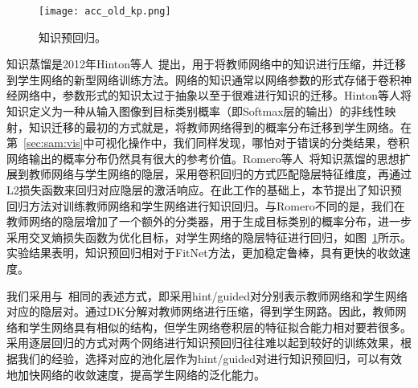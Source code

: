 \begin{figure}[t]
\centering
\centerline{\texttt{[image: acc\_old\_kp.png]}}
\caption{知识预回归。}
\label{fig:acc_kp}
\end{figure} 

知识蒸馏是2012年Hinton等人~\cite{hinton2015distilling}提出，用于将教师网络中的知识进行压缩，并迁移到学生网络的新型网络训练方法。网络的知识通常以网络参数的形式存储于卷积神经网络中，参数形式的知识太过于抽象以至于很难进行知识的迁移。Hinton等人将知识定义为一种从输入图像到目标类别概率（即Softmax层的输出）的非线性映射，知识迁移的最初的方式就是，将教师网络得到的概率分布迁移到学生网络。在第~\ref{sec:sam:vis}中可视化操作中，我们同样发现，哪怕对于错误的分类结果，卷积网络输出的概率分布仍然具有很大的参考价值。Romero等人~\cite{romero2014fitnets}将知识蒸馏的思想扩展到教师网络与学生网络的隐层，采用卷积回归的方式匹配隐层特征维度，再通过L2损失函数来回归对应隐层的激活响应。在此工作的基础上，本节提出了知识预回归方法对训练教师网络和学生网络进行知识回归。与Romero不同的是，我们在教师网络的隐层增加了一个额外的分类器，用于生成目标类别的概率分布，进一步采用交叉熵损失函数为优化目标，对学生网络的隐层特征进行回归，如图~\ref{fig:acc_kp}所示。实验结果表明，知识预回归相对于FitNet方法，更加稳定鲁棒，具有更快的收敛速度。

我们采用与~\cite{romero2014fitnets}相同的表述方式，即采用hint/guided对分别表示教师网络和学生网络对应的隐层对。通过DK分解对教师网络进行压缩，得到学生网路。因此，教师网络和学生网络具有相似的结构，但学生网络卷积层的特征拟合能力相对要若很多。采用逐层回归的方式对两个网络进行知识预回归往往难以起到较好的训练效果，根据我们的经验，选择对应的池化层作为hint/guided对进行知识预回归，可以有效地加快网络的收敛速度，提高学生网络的泛化能力。

